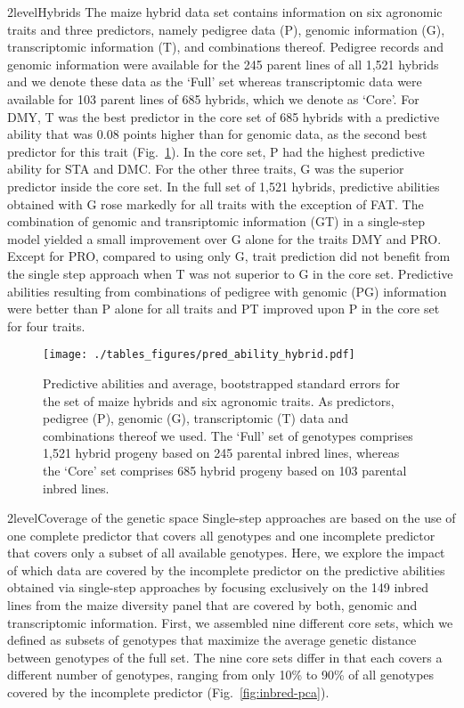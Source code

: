 \documentclass[12pt,titlepage]{article}
\begin{document}
\Genetics2level{Hybrids}
The maize hybrid data set contains information on six agronomic traits and
three predictors, namely pedigree data (P), genomic information (G), 
transcriptomic information (T), and combinations thereof.
Pedigree records and genomic information were available for the 245 parent 
lines of all 1,521 hybrids and we denote these data as the `Full' set whereas
transcriptomic data were available for 103 parent lines of 685 hybrids, which
we denote as `Core'.
For DMY, T was the best predictor in the core set of 685 hybrids with a 
predictive ability that was 0.08 points higher than for genomic data, as the 
second best predictor for this trait (Fig.~\ref{fig:HybridResults}).
In the core set, P had the highest predictive ability for STA and DMC\@.
For the other three traits, G was the superior predictor inside the core set.
In the full set of 1,521 hybrids, predictive abilities obtained with G rose 
markedly for all traits with the exception of FAT\@.
The combination of genomic and transriptomic information (GT) in a single-step
model yielded a small improvement over G alone for the traits DMY and PRO\@.
Except for PRO, compared to using only G, trait prediction did not benefit from 
the single step approach when T was not superior to G in the core set.
Predictive abilities resulting from combinations of pedigree with genomic (PG)
information were better than P alone for all traits and PT improved upon P in
the core set for four traits.

\begin{figure}[H]
\centering
  \texttt{[image: ./tables\_figures/pred\_ability\_hybrid.pdf]}
  \caption{
    Predictive abilities and average, bootstrapped standard errors for the set
    of maize hybrids and six agronomic traits.
    As predictors, pedigree (P), genomic (G), transcriptomic (T) data and 
    combinations thereof we used.
    The `Full' set of genotypes comprises 1,521 hybrid progeny based on 245
    parental inbred lines, whereas the `Core' set comprises 685 hybrid progeny
    based on 103 parental inbred lines.
  }
\label{fig:HybridResults}
\end{figure}





\Genetics2level{Coverage of the genetic space}
Single-step approaches are based on the use of one complete predictor that
covers all genotypes and one incomplete predictor that covers only a subset of
all available genotypes.
Here, we explore the impact of which data are covered by the incomplete 
predictor on the predictive abilities obtained via single-step approaches by
focusing exclusively on the 149 inbred lines from the maize diversity panel
that are covered by both, genomic and transcriptomic information.
First, we assembled nine different core sets, which we defined as subsets
of genotypes that maximize the average genetic distance between genotypes of
the full set.
The nine core sets differ in that each covers a different number of genotypes,
ranging from only 10\% to 90\% of all genotypes covered by the incomplete
predictor (Fig.~\ref{fig:inbred-pca}).
\end{document}
